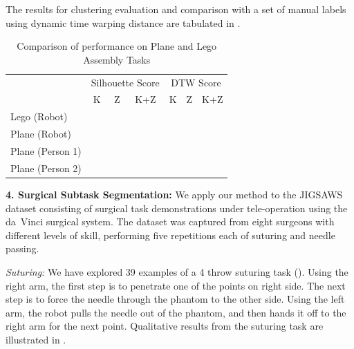 The results for clustering evaluation and comparison with a set of manual labels using dynamic time warping distance are tabulated in .

\begin{table}[t!]
\centering
\caption{Comparison of \TSC performance on Plane and Lego Assembly Tasks }
\label{tab:pr2}
\begin{tabular}{l|l|l|l|l|l|l}
\multicolumn{1}{c}{}                                     &     \multicolumn{3}{c}{\cellcolor[HTML]{CBCEFB}Silhouette Score} & \multicolumn{3}{c}{\cellcolor[HTML]{FFC72C}DTW Score}\\
\multicolumn{1}{c}{}    & \multicolumn{1}{c|}{K} & \multicolumn{1}{c|}{Z} & \multicolumn{1}{c|}{K+Z}& \multicolumn{1}{c|}{K} & \multicolumn{1}{c|}{Z} & \multicolumn{1}{c}{K+Z} \\ \hline \hline 
\rowcolor[HTML]{E0E0E0}
 Lego (Robot)    & &    &   &   &  &    \\ 
 Plane (Robot)   & &    &   &   &  &    \\ 
\rowcolor[HTML]{E0E0E0}
 Plane (Person 1) & &    &   &   &  &    \\ 
 Plane (Person 2)      & &    &   &   &  &    \\  \hline
\end{tabular}
\vspace{-10pt}
\end{table}



\vspace{5pt}
\noindent \textbf{4. Surgical Subtask Segmentation: }
We apply our method to the JIGSAWS dataset\cite{gao2014jigsaws} consisting of surgical task demonstrations under tele-operation using the da~Vinci surgical system. The dataset was captured from eight surgeons with different levels of skill, performing five repetitions each of suturing and needle passing.

\vspace{0.5em}
\noindent\textit{Suturing: }We have explored 39 examples of a 4 throw suturing task (). Using the right arm, the first step is to penetrate one of the points on right side. The next step is to force the needle through the phantom to the other side. Using the left arm, the robot pulls the needle out of the phantom, and then hands it off to the right arm for the next point. Qualitative results from the suturing task are illustrated in .

